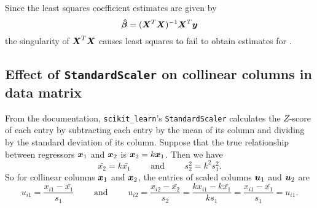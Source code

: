 \documentclass[12pt]{article}
\newcommand{\gbh}{\hat{\gb}}
\begin{document}
	Since the least squares coefficient estimates are given by
	$$\boldsymbol{\gbh}=(\bmX^T\bmX)^{-1}\bmX^T\bmy$$
	the singularity of $\boldsymbol{X}^T\boldsymbol{X}$ causes least squares to fail to obtain estimates for .
	
	\subsection{Effect of \texttt{StandardScaler} on collinear columns in data matrix \label{sec:append4}}
	From the documentation, \texttt{scikit\_learn}'s \texttt{StandardScaler} calculates the $Z$-score of each entry by subtracting each entry by the mean of its column and dividing by the standard deviation of its column. Suppose that the true relationship between regressors $\boldsymbol{x}_1$ and $\boldsymbol{x}_2$ is $\boldsymbol{x}_2=k\boldsymbol{x}_1$. Then we have
	$$\bar{x_2}=k\bar{x_1}\quad \quad \text{ and }\quad \quad s^2_2=k^2s_1^2.$$
	So for collinear columns $\boldsymbol{x}_1$ and $\boldsymbol{x}_2$, the entries of scaled columns $\boldsymbol{u}_1$ and $\boldsymbol{u}_2$ are
	$$u_{i1}=\frac{x_{i1}-\bar{x_1}}{s_1}\quad\quad\text{ and }\quad \quad u_{i2}=\frac{x_{i2}-\bar{x_2}}{s_2}=\frac{kx_{i1}-k\bar{x_1}}{ks_1}=\frac{x_{i1}-\bar{x_1}}{s_1}=u_{i1}.$$
	
	\pagebreak
	
	
\end{document}
